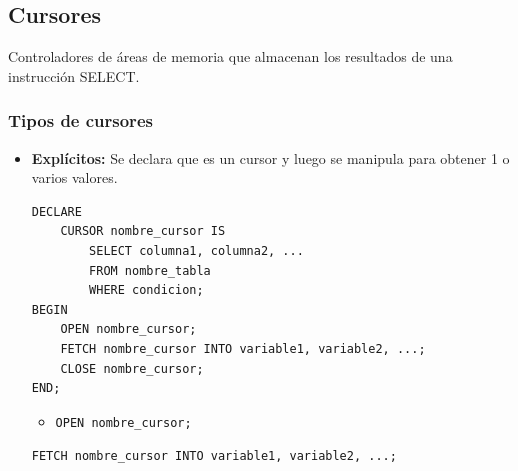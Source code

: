 \documentclass{templateNote}
\begin{document}
\newpage
\subsection{Cursores}
\indent
Controladores de áreas de memoria que almacenan los resultados de una instrucción SELECT.
\subsubsection{Tipos de cursores}
\begin{itemize}
    \item \textbf{Explícitos:} Se declara que es un cursor y luego se manipula para obtener 1 o varios valores.
    \begin{tcolorbox}[
        colframe=Salmon!100, %
        colback=Salmon!20,       %
        coltitle=black!100, %
        title=\textbf{PL/SQL}, %
    ]
        \begin{Verbatim}[breaklines=true]
DECLARE
    CURSOR nombre_cursor IS
        SELECT columna1, columna2, ...
        FROM nombre_tabla
        WHERE condicion;
BEGIN
    OPEN nombre_cursor;
    FETCH nombre_cursor INTO variable1, variable2, ...;
    CLOSE nombre_cursor;
END;
        \end{Verbatim}
    \end{tcolorbox}
    \begin{itemize}[label={}]
        \item \begin{tcolorbox}[
            colframe=Celeste!100, %
            colback=Celeste!20,       %
            coltitle=black!100, %
            title=\textbf{PL/SQL}: \textit{Abrir el cursor.}, %
        ]
            \begin{Verbatim}[breaklines=true]
    OPEN nombre_cursor;
            \end{Verbatim}
        \end{tcolorbox}
    \end{itemize}
    \begin{tcolorbox}[
        colframe=Celeste!100, %
        colback=Celeste!20,       %
        coltitle=black!100, %
        title=\textbf{PL/SQL}: \textit{Recuperar los datos del Buffer.}, %
    ]
        \begin{Verbatim}[breaklines=true]
FETCH nombre_cursor INTO variable1, variable2, ...;
        \end{Verbatim}
    \end{tcolorbox}


\end{itemize}
\end{document}
